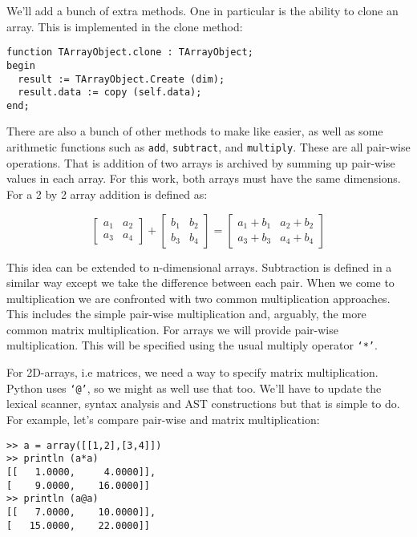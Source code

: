 We'll add a bunch of extra methods. One in particular is the ability to clone an array. This is implemented in the clone method:

\begin{lstlisting}
function TArrayObject.clone : TArrayObject;
begin
  result := TArrayObject.Create (dim);
  result.data := copy (self.data);
end;
\end{lstlisting}

There are also a bunch of other methods to make like easier, as well as some arithmetic functions such as {\tt add}, {\tt subtract}, and {\tt multiply}. These are all pair-wise operations.
That is addition of two arrays is archived by summing up pair-wise values in each array.  For this work, both arrays must have the same dimensions. For a 2 by 2 array addition is defined as:

$$
\begin{bmatrix}
  a_1 & a_2 \\
  a_3 & a_4
\end{bmatrix}
+
\begin{bmatrix}
  b_1 & b_2 \\
  b_3 & b_4
\end{bmatrix}
=
\begin{bmatrix}
  a_1+b_1 & a_2+b_2 \\
  a_3 + b_3 & a_4 + b_4
\end{bmatrix}
$$

This idea can be extended to n-dimensional arrays. Subtraction is defined in a similar way except we take the difference between each pair. When we come to multiplication we are confronted with two common multiplication approaches. This includes the simple pair-wise multiplication and, arguably, the more common matrix multiplication. For arrays we will provide pair-wise multiplication. This will be specified using the usual multiply operator {\tt `*'}.

For 2D-arrays, i.e matrices, we need a way to specify matrix multiplication. Python uses {\tt `@'}, so we might as well use that too. We'll have to update the lexical scanner, syntax analysis and AST constructions but that is simple to do. For example, let's compare pair-wise and matrix multiplication:

\begin{lstlisting}
>> a = array([[1,2],[3,4]])
>> println (a*a)
[[   1.0000,     4.0000]],
[    9.0000,    16.0000]]
>> println (a@a)
[[   7.0000,    10.0000]],
[   15.0000,    22.0000]]
\end{lstlisting}


